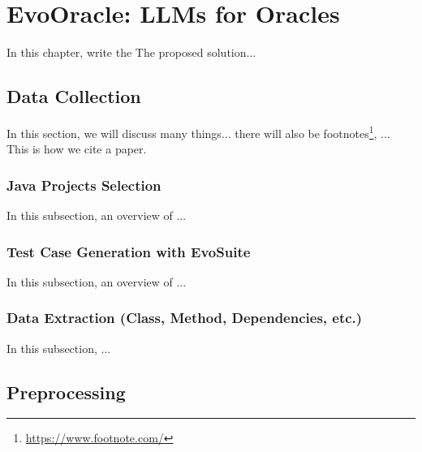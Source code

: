 \chapter{EvoOracle: LLMs for Oracles}
\label{cha:evoOracles}
\vspace{0.4 cm}

In this chapter, write the The proposed solution...


\section{Data Collection}
\label{sec:data_collection}
\vspace{0.2 cm}

In this section, we will discuss many things... there will also be footnotes\footnote{ \url{https://www.footnote.com/} }, ...
This is how we cite\cite{gabriel_ryan_toga_2022} a paper.

\vspace{0.1 cm}
\subsection{Java Projects Selection}
\label{sec:projects_selection}
\vspace{0.1 cm}

In this subsection, an overview of ...

\vspace{0.1 cm}
\subsection{Test Case Generation with EvoSuite}
\label{sec:test_case_generation}
\vspace{0.1 cm}

In this subsection, an overview of ...

\vspace{0.1 cm}
\subsection{Data Extraction (Class, Method, Dependencies, etc.)}
\label{sec:data_extraction}
\vspace{0.1 cm}

In this subsection, ...

\section{Preprocessing}
\label{sec:preprocessing}
\vspace{0.2 cm}

